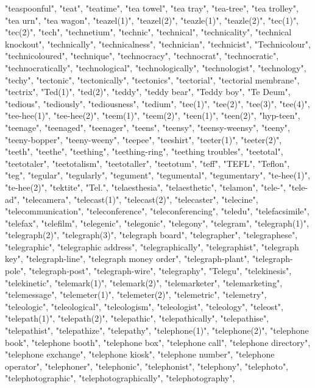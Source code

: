 "teaspoonful",
"teat",
"teatime",
"tea towel",
"tea tray",
"tea-tree",
"tea trolley",
"tea urn",
"tea wagon",
"teazel(1)",
"teazel(2)",
"teazle(1)",
"teazle(2)",
"tec(1)",
"tec(2)",
"tech",
"technetium",
"technic",
"technical",
"technicality",
"technical knockout",
"technically",
"technicalness",
"technician",
"technicist",
"Technicolour",
"technicoloured",
"technique",
"technocracy",
"technocrat",
"technocratic",
"technocratically",
"technological",
"technologically",
"technologist",
"technology",
"techy",
"tectonic",
"tectonically",
"tectonics",
"tectorial",
"tectorial membrane",
"tectrix",
"Ted(1)",
"ted(2)",
"teddy",
"teddy bear",
"Teddy boy",
"Te Deum",
"tedious",
"tediously",
"tediousness",
"tedium",
"tee(1)",
"tee(2)",
"tee(3)",
"tee(4)",
"tee-hee(1)",
"tee-hee(2)",
"teem(1)",
"teem(2)",
"teen(1)",
"teen(2)",
"hyp-teen",
"teenage",
"teenaged",
"teenager",
"teens",
"teensy",
"teensy-weensy",
"teeny",
"teeny-bopper",
"teeny-weeny",
"teepee",
"teeshirt",
"teeter(1)",
"teeter(2)",
"teeth",
"teethe",
"teething",
"teething-ring",
"teething troubles",
"teetotal",
"teetotaler",
"teetotalism",
"teetotaller",
"teetotum",
"teff",
"TEFL",
"Teflon",
"teg",
"tegular",
"tegularly",
"tegument",
"tegumental",
"tegumentary",
"te-hee(1)",
"te-hee(2)",
"tektite",
"Tel.",
"telaesthesia",
"telaesthetic",
"telamon",
"tele-",
"tele-ad",
"telecamera",
"telecast(1)",
"telecast(2)",
"telecaster",
"telecine",
"telecommunication",
"teleconference",
"teleconferencing",
"teledu",
"telefacsimile",
"telefax",
"telefilm",
"telegenic",
"telegonic",
"telegony",
"telegram",
"telegraph(1)",
"telegraph(2)",
"telegraph(3)",
"telegraph board",
"telegrapher",
"telegraphese",
"telegraphic",
"telegraphic address",
"telegraphically",
"telegraphist",
"telegraph key",
"telegraph-line",
"telegraph money order",
"telegraph-plant",
"telegraph-pole",
"telegraph-post",
"telegraph-wire",
"telegraphy",
"Telegu",
"telekinesis",
"telekinetic",
"telemark(1)",
"telemark(2)",
"telemarketer",
"telemarketing",
"telemessage",
"telemeter(1)",
"telemeter(2)",
"telemetric",
"telemetry",
"teleologic",
"teleological",
"teleologism",
"teleologist",
"teleology",
"teleost",
"telepath(1)",
"telepath(2)",
"telepathic",
"telepathically",
"telepathise",
"telepathist",
"telepathize",
"telepathy",
"telephone(1)",
"telephone(2)",
"telephone book",
"telephone booth",
"telephone box",
"telephone call",
"telephone directory",
"telephone exchange",
"telephone kiosk",
"telephone number",
"telephone operator",
"telephoner",
"telephonic",
"telephonist",
"telephony",
"telephoto",
"telephotographic",
"telephotographically",
"telephotography",
